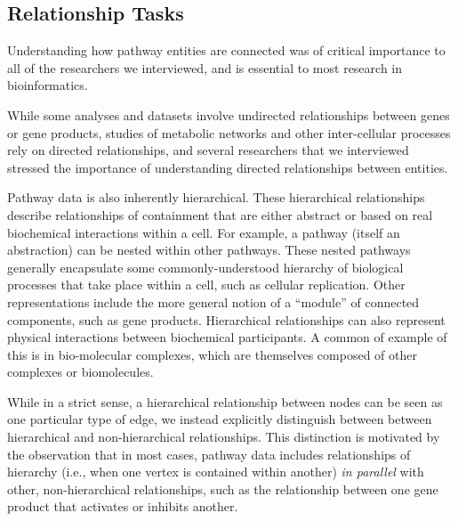 \documentclass{egpubl}
\begin{document}
\subsection{Relationship Tasks}


Understanding how pathway entities are connected was of critical importance to all of the researchers we interviewed, and is essential to most research in bioinformatics.

While some analyses and datasets involve undirected relationships between genes or gene products, studies of metabolic networks and other inter-cellular processes rely on directed relationships, and several researchers that we interviewed stressed the importance of understanding directed relationships between entities.


Pathway data is also inherently hierarchical.
These hierarchical relationships describe relationships of containment that are either abstract or based on real biochemical interactions within a cell.
For example, a pathway (itself an abstraction) can be nested within other pathways.
These nested pathways generally encapsulate some commonly-understood hierarchy of biological processes that take place within a cell, such as cellular replication.
Other representations include the more general notion of a ``module'' of connected components, such as gene products.
Hierarchical relationships can also represent physical interactions between biochemical participants.
A common of example of this is in bio-molecular complexes, which are themselves composed of other complexes or biomolecules.

While in a strict sense, a hierarchical relationship between nodes can be seen as one particular type of edge, we instead explicitly distinguish between between hierarchical and non-hierarchical relationships.
This distinction is motivated by the observation that in most cases, pathway data includes relationships of hierarchy (i.e., when one vertex is contained within another) \textit{in parallel} with other, non-hierarchical relationships, such as the relationship between one gene product that activates or inhibits another.
\end{document}

